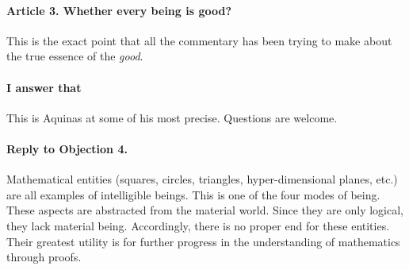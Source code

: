 \documentclass{ucetd}
\begin{document}
\paragraph{Article 3. Whether every being is good?}
This is the exact point that all the commentary has been trying to make about the true essence of the \textit{good}.
\paragraph{I answer that}
This is Aquinas at some of his most precise. Questions are welcome.
\paragraph{Reply to Objection 4.}
Mathematical entities (squares, circles, triangles, hyper-dimensional planes, etc.) are all examples of intelligible beings. This is one of the four modes of being. These aspects are abstracted from the material world. Since they are only logical, they lack material being. Accordingly, there is no proper end for these entities. Their greatest utility is for further progress in the understanding of mathematics through proofs.
\end{document}
